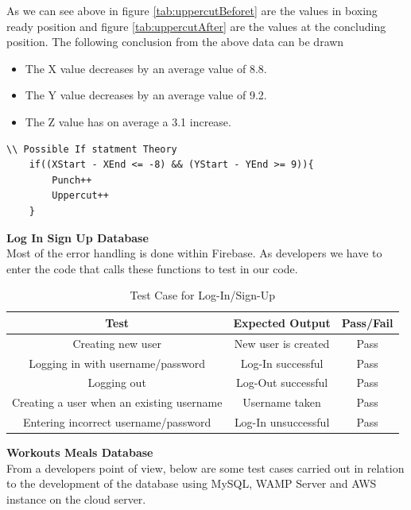 \documentclass[a4paper,12pt]{report}
\begin{document}
As we can see above in figure \ref{tab:uppercutBeforet} are the values in boxing ready position and figure \ref{tab:uppercutAfter} are the values at the concluding position.
The following conclusion from the above data can be drawn 
\begin{itemize}
    \item The X value decreases by an average value of 8.8.
    \item The Y value decreases by an average value of 9.2.
    \item The Z value has on average a 3.1 increase.
\end{itemize}
\begin{verbatim}
\\ Possible If statment Theory
    if((XStart - XEnd <= -8) && (YStart - YEnd >= 9)){
        Punch++
        Uppercut++
    }
\end{verbatim}

\textbf{Log In Sign Up Database}\\
Most of the error handling is done within Firebase. As developers we have to enter the code that calls these functions to test in our code.  

\begin{table}[h]
    \centering
    \begin{tabular}{||c c c||} 
     \hline
     \textbf{Test} & \textbf{Expected Output} & \textbf{Pass/Fail} \\ [0.5ex] 
     \hline\hline
     Creating new user & New user is created & Pass \\ 
     \hline
     Logging in with username/password & Log-In successful & Pass \\  
     \hline
     Logging out & Log-Out successful & Pass \\
     \hline
     Creating a user when an existing username & Username taken & Pass \\
     \hline
     Entering incorrect username/password & Log-In unsuccessful & Pass \\
     \hline
    \end{tabular}
    \caption{Test Case for Log-In/Sign-Up}
    \label{tab:LogInTest}
\end{table}

\textbf{Workouts Meals Database}\\
From a developers point of view, below are some test cases carried out in relation to the development of the database using MySQL, WAMP Server and AWS instance on the cloud server.
\end{document}
